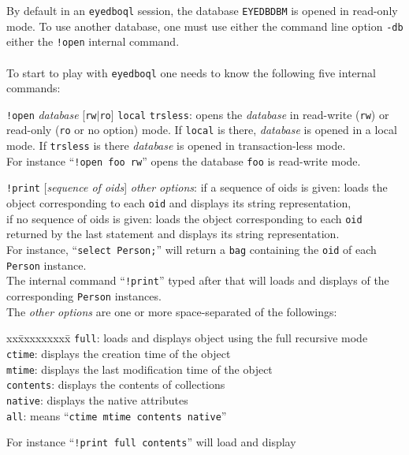 By default in an \texttt{eyedboql} session, the database \texttt{EYEDBDBM} is opened in
read-only mode. To use another database, one must use either the command line
option \texttt{-db} either the \texttt{!open} internal command.\\
\\
To start to play with \texttt{eyedboql} one needs to know the following
five internal commands:
\be
\item \texttt{!open} \emph{database} [\texttt{rw}$|$\texttt{ro}] \texttt{local} \texttt{trsless}:
opens the \emph{database} in read-write (\texttt{rw}) or
read-only (\texttt{ro} or no option) mode. If \texttt{local} is there,
\emph{database} is opened in a local mode. If \texttt{trsless} is
there \emph{database} is opened in transaction-less mode.\\
For instance ``\texttt{!open foo rw}'' opens the database \texttt{foo} is
read-write mode.
\item \texttt{!print} [\emph{sequence of oids}] \emph{other options}: 	
if a sequence of oids is given: loads the object corresponding to each \texttt{oid}
and displays its string representation,\\
if no sequence of oids is given: loads the object corresponding to each \texttt{oid}
returned by the last statement and displays its string representation.\\
For instance, ``\texttt{select Person;}'' will return a \texttt{bag} containing
the \texttt{oid} of each \texttt{Person} instance.\\
The internal command ``\texttt{!print}'' typed after that will loads and
displays of the corresponding \texttt{Person} instances.\\
The \emph{other options} are one or more space-separated of the followings:
\begin{tabbing}
xx\=xxxxxxxxx\=\kill
\>\texttt{full}\>: loads and displays object using the full recursive mode\\
\>\texttt{ctime}\>: displays the creation time of the object\\
\>\texttt{mtime}\>: displays the last modification time of the object\\
\>\texttt{contents}\>:  displays the contents of collections\\
\>\texttt{native}\>:  displays the native attributes\\
\>\texttt{all}\>: means ``\texttt{ctime mtime contents native}''
\end{tabbing}
For instance ``\texttt{!print full contents}'' will load and display 
